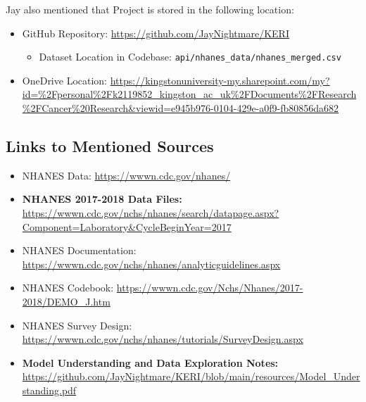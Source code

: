 \documentclass[12pt]{article}
\begin{document}
Jay also mentioned that Project is stored in the following location:
\begin{itemize}
    \item GitHub Repository: \url{https://github.com/JayNightmare/KERI}
    \begin{itemize}
        \item Dataset Location in Codebase: \texttt{api/nhanes\_data/nhanes\_merged.csv}
    \end{itemize}
    \item OneDrive Location: \url{https://kingstonuniversity-my.sharepoint.com/my?id=%2Fpersonal%2Fk2119852_kingston_ac_uk%2FDocuments%2FResearch%2FCancer%20Research&viewid=e945b976-0104-429e-a0f9-fb80856da682}
\end{itemize}

\subsection{Links to Mentioned Sources}
\begin{itemize}
    \item NHANES Data: \url{https://wwwn.cdc.gov/nhanes/}
    \item \textbf{NHANES 2017-2018 Data Files:} \url{https://wwwn.cdc.gov/nchs/nhanes/search/datapage.aspx?Component=Laboratory&CycleBeginYear=2017}
    \item NHANES Documentation: \url{https://wwwn.cdc.gov/nchs/nhanes/analyticguidelines.aspx}
    \item NHANES Codebook: \url{https://wwwn.cdc.gov/Nchs/Nhanes/2017-2018/DEMO_J.htm}
    \item NHANES Survey Design: \url{https://wwwn.cdc.gov/nchs/nhanes/tutorials/SurveyDesign.aspx}
    \item \textbf{Model Understanding and Data Exploration Notes:} \url{https://github.com/JayNightmare/KERI/blob/main/resources/Model_Understanding.pdf}
\end{itemize}
\end{document}
